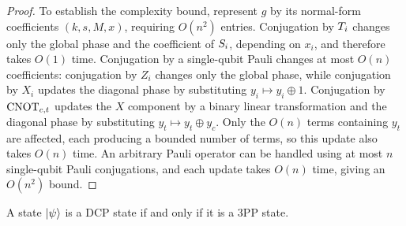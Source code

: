 \begin{proof}
To establish the complexity bound, represent $g$ by its normal-form coefficients $(k,s,M,x)$, requiring $O(n^2)$ entries.
Conjugation by $\T_i$ changes only the global phase and the coefficient of $\S_i$, depending on $x_i$, and therefore takes $O(1)$ time.
Conjugation by a single-qubit Pauli changes at most $O(n)$ coefficients: conjugation by $Z_i$ changes only the global phase, while conjugation by $X_i$ updates the diagonal phase by substituting $y_i\mapsto y_i\oplus1$.
Conjugation by $\CNOT_{c,t}$ updates the $X$ component by a binary linear transformation and the diagonal phase by substituting $y_t\mapsto y_t\oplus y_c$.
Only the $O(n)$ terms containing $y_t$ are affected, each producing a bounded number of terms, so this update also takes $O(n)$ time.
An arbitrary Pauli operator can be handled using at most $n$ single-qubit Pauli conjugations, and each update takes $O(n)$ time, giving an $O(n^2)$ bound.
\end{proof}

\begin{theorem}\label{thm:3pp-dcp}
    A state $\ket{\psi}$ is a DCP state if and only if it is a 3PP state.
\end{theorem}

